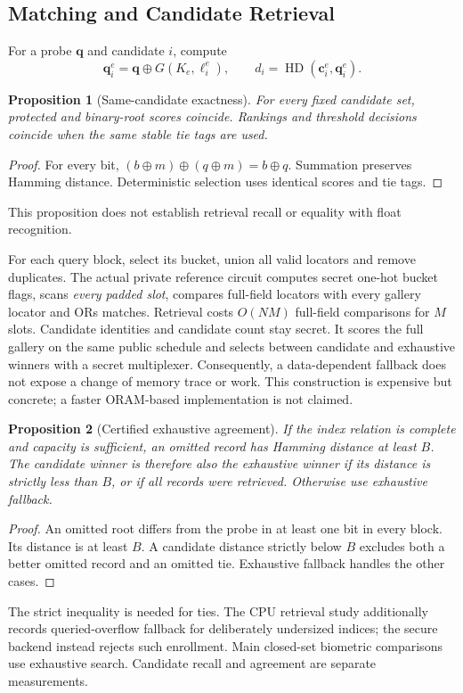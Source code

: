 \documentclass[journal]{IEEEtran}
\newcommand{\HD}{\operatorname{HD}}
\newtheorem{proposition}{Proposition}
\begin{document}
\subsection{Matching and Candidate Retrieval}\label{sec:retrieval}
For a probe $\mathbf q$ and candidate $i$, compute
\begin{equation}
\mathbf q_i^e=\mathbf q\oplus G(K_e,\ell_i^e),\qquad
d_i=\HD(\mathbf c_i^e,\mathbf q_i^e).
\end{equation}
\begin{proposition}[Same-candidate exactness]\label{prop:exact}
For every fixed candidate set, protected and binary-root scores coincide. Rankings and threshold decisions coincide when the same stable tie tags are used.
\end{proposition}
\begin{proof}
For every bit, $(b\oplus m)\oplus(q\oplus m)=b\oplus q$. Summation preserves Hamming distance. Deterministic selection uses identical scores and tie tags.
\end{proof}
This proposition does not establish retrieval recall or equality with float recognition.

For each query block, select its bucket, union all valid locators and remove duplicates. The actual private reference circuit computes secret one-hot bucket flags, scans \emph{every padded slot}, compares full-field locators with every gallery locator and ORs matches. Retrieval costs $O(NM)$ full-field comparisons for $M$ slots. Candidate identities and candidate count stay secret. It scores the full gallery on the same public schedule and selects between candidate and exhaustive winners with a secret multiplexer. Consequently, a data-dependent fallback does not expose a change of memory trace or work. This construction is expensive but concrete; a faster ORAM-based implementation is not claimed.

\begin{proposition}[Certified exhaustive agreement]\label{prop:certificate}
If the index relation is complete and capacity is sufficient, an omitted record has Hamming distance at least $B$. The candidate winner is therefore also the exhaustive winner if its distance is strictly less than $B$, or if all records were retrieved. Otherwise use exhaustive fallback.
\end{proposition}
\begin{proof}
An omitted root differs from the probe in at least one bit in every block. Its distance is at least $B$. A candidate distance strictly below $B$ excludes both a better omitted record and an omitted tie. Exhaustive fallback handles the other cases.
\end{proof}
The strict inequality is needed for ties. The CPU retrieval study additionally records queried-overflow fallback for deliberately undersized indices; the secure backend instead rejects such enrollment. Main closed-set biometric comparisons use exhaustive search. Candidate recall and agreement are separate measurements.
\end{document}
